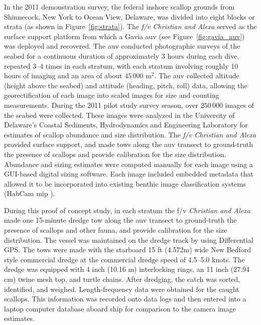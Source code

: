 \documentclass {udthesis}
\begin{document}
In the 2011 demonstration survey, the federal inshore scallop grounds from Shinnecock, New York to Ocean View, Delaware, was divided into eight blocks or strata (as shown in Figure~\ref{fig:strata}).  
The \textit{f/v Christian and Alexa} served as the surface support platform 
from which a Gavia \gls{auv} (see Figure~\ref{fig:gavia_auv}) was deployed and recovered.  The \gls{auv} 
conducted photographic surveys of the seabed for a continuous duration of approximately
3 hours during each dive, repeated 3--4 times in each stratum, with
each stratum involving roughly 10 hours of imaging and an area of about $45\,000$ 
m$^2$.
The \gls{auv} collected altitude (height above the seabed) and 
attitude (heading, pitch, roll) data, allowing the georectification of each image 
into scaled images for size and counting measurements.  During the 2011 pilot study 
survey season, over $250\,000$ images of the seabed were collected. 
These images were analyzed in the University of Delaware's Coastal Sediments, Hydrodynamics and Engineering 
Laboratory for estimates of scallop
abundance and size distribution.  The \textit{f/v Christian and Alexa} provided 
surface support, and made tows along the \gls{auv} transect to ground-truth the presence of 
scallops and provide calibration for the size distribution. 
Abundance and sizing estimates were computed manually for each image using a GUI-based 
digital sizing software. 
Each image included embedded metadata that 
allowed it to be incorporated into existing benthic image classification systems
(HabCam mip \cite{dawkings13}).

During this proof of concept study, in each stratum the f/v
\textit{Christian and Alexa} made one 15-minute dredge tow along the \gls{auv} 
transect to ground-truth the presence of scallops and other fauna, 
and provide calibration for the size distribution.  The vessel was maintained 
on the dredge track by using Differential GPS.  
The tows were made with the starboard 15 ft 
(4.572\;m)
wide New Bedford style commercial dredge at the commercial dredge speed of 4.5--5.0 knots.
The dredge was equipped with 4 inch (10.16 m) interlocking rings, 
an 11 inch (27.94 cm) twine mesh top, and turtle chains.
After dredging, the catch was sorted, identified, and weighed.  
Length-frequency data were obtained for the caught scallops.  
This information was recorded onto data logs and then entered into a laptop computer database aboard ship for comparison to the camera image estimates.
\end{document}

